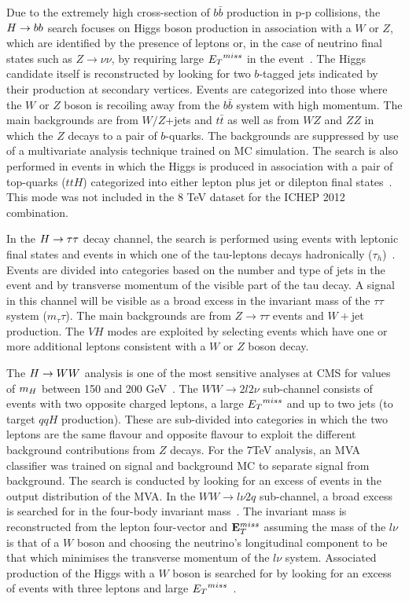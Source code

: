 Due to the extremely high cross-section of $b\bar{b}$ production in 
p-p collisions, the $H\rightarrow bb$ search focuses on Higgs boson production in association
with a $W$ or $Z$, which are identified by the presence of leptons or, in the case 
of neutrino final states such as $Z\rightarrow \nu\nu$, by requiring large ${E_{T}}^{miss}$ 
in the event~\citep{HIG-12-019}. The Higgs candidate itself is reconstructed by looking for two 
$b$-tagged jets indicated by their production at secondary vertices. Events are 
categorized into those where the 
$W$ or $Z$ boson is recoiling away from the $b\bar{b}$ system with high momentum.
The main backgrounds are from $W/Z$+jets and $t\bar{t}$ as well as from $WZ$ and $ZZ$
in which the $Z$ decays to a pair of $b$-quarks. The backgrounds are suppressed
by use of a multivariate analysis technique trained on MC simulation.
The search is also performed in events in which the Higgs is produced in association
with a pair of top-quarks ($ttH$) categorized into either lepton plus jet or dilepton 
final states~\citep{HIG-12-019}. This mode was not included in the 8 TeV dataset
for the ICHEP 2012 combination.

In the $H\rightarrow\tau\tau$ decay channel, the search is performed using events with leptonic
final states and events in which one of the tau-leptons decays hadronically 
($\tau_{h}$)~\citep{HIG-12-018}.
Events are divided into categories based on the number and type of jets in the event
and by transverse momentum of the visible part of the tau decay.
A signal in this channel will be visible as a broad excess in the invariant mass
of the $\tau\tau$ system ($m_\tau\tau$). The main backgrounds are from
$Z\rightarrow\tau\tau$ events and $W+$jet production. The $VH$ modes are
exploited by selecting events which have one or more additional leptons 
consistent with a $W$ or $Z$ boson decay.

The $H\rightarrow WW$ analysis is one of the most sensitive analyses at CMS for
values of $m_{H}$ between 150 and 200 GeV~\citep{HIG-12-017}. 
The $WW\rightarrow2l2\nu$ sub-channel consists of events with 
two opposite charged leptons, a large ${E_{T}}^{miss}$ and up 
to two jets (to target $qqH$ production).
These are sub-divided into categories in which the two leptons
are the same flavour and opposite flavour to exploit the different
background contributions from $Z$ decays. For the 7TeV analysis,
an MVA classifier was trained on signal and background 
MC to separate signal from background. The search is conducted by looking 
for an excess of events in the output distribution of the MVA.
In the $WW\rightarrow l\nu 2q$ sub-channel, a broad excess is searched
for in the four-body invariant mass~\citep{HIG-12-021}. 
The invariant mass is reconstructed from the lepton four-vector and ${\mathbf{E}^{miss}_{T}}$ 
assuming the mass of the $l\nu$ is that of a $W$ boson and 
choosing the neutrino's longitudinal component to be that which minimises 
the transverse momentum of the $l\nu$ system.
Associated production of the Higgs with a $W$ boson is searched for 
by looking for an excess of events with three leptons and large 
${E_{T}}^{miss}$~\citep{HIG-11-034}.

